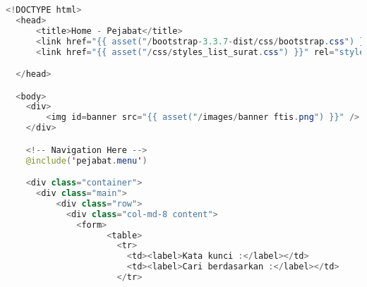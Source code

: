 \begin{lstlisting}[language=Java,basicstyle=\tiny,caption=\textit{Home} pejabat]
	<!DOCTYPE html>
  <head>
      <title>Home - Pejabat</title>
      <link href="{{ asset("/bootstrap-3.3.7-dist/css/bootstrap.css") }}" rel="stylesheet" type="text/css" />
      <link href="{{ asset("/css/styles_list_surat.css") }}" rel="stylesheet" type="text/css">

  </head>

  <body>
    <div>
        <img id=banner src="{{ asset("/images/banner ftis.png") }}" />
    </div>

    <!-- Navigation Here -->
    @include('pejabat.menu')

    <div class="container">
      <div class="main">
          <div class="row">
            <div class="col-md-8 content">
              <form>
                    <table>
                      <tr>
                        <td><label>Kata kunci :</label></td>
                        <td><label>Cari berdasarkan :</label></td>
                      </tr>


\end{lstlisting}
